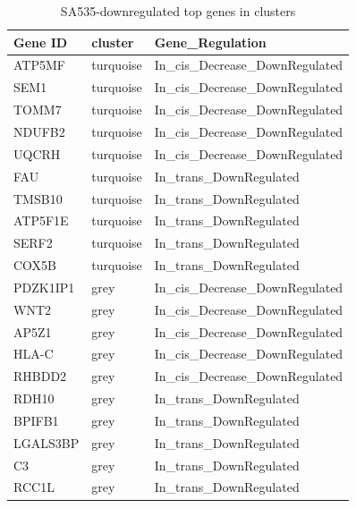 
 \begin{table}[htbp]
   \centering
   \caption{SA535-downregulated top genes in clusters}
     \begin{tabular}{|l|l|l|}
     \hline
     Gene ID & cluster & Gene\_Regulation \\
     \hline
     ATP5MF & turquoise & In\_cis\_Decrease\_DownRegulated \\
     SEM1 & turquoise & In\_cis\_Decrease\_DownRegulated \\
     TOMM7 & turquoise & In\_cis\_Decrease\_DownRegulated \\
     NDUFB2 & turquoise & In\_cis\_Decrease\_DownRegulated \\
     UQCRH & turquoise & In\_cis\_Decrease\_DownRegulated \\
     FAU & turquoise & In\_trans\_DownRegulated \\
     TMSB10 & turquoise & In\_trans\_DownRegulated \\
     ATP5F1E & turquoise & In\_trans\_DownRegulated \\
     SERF2 & turquoise & In\_trans\_DownRegulated \\
     COX5B & turquoise & In\_trans\_DownRegulated \\
     PDZK1IP1 & grey & In\_cis\_Decrease\_DownRegulated \\
     WNT2 & grey & In\_cis\_Decrease\_DownRegulated \\
     AP5Z1 & grey & In\_cis\_Decrease\_DownRegulated \\
     HLA-C & grey & In\_cis\_Decrease\_DownRegulated \\
     RHBDD2 & grey & In\_cis\_Decrease\_DownRegulated \\
     RDH10 & grey & In\_trans\_DownRegulated \\
     BPIFB1 & grey & In\_trans\_DownRegulated \\
     LGALS3BP & grey & In\_trans\_DownRegulated \\
     C3 & grey & In\_trans\_DownRegulated \\
     RCC1L & grey & In\_trans\_DownRegulated \\
     \hline
     \end{tabular}%
   \label{tab:SA535downregulatedgenesinclusters}%
 \end{table}%
